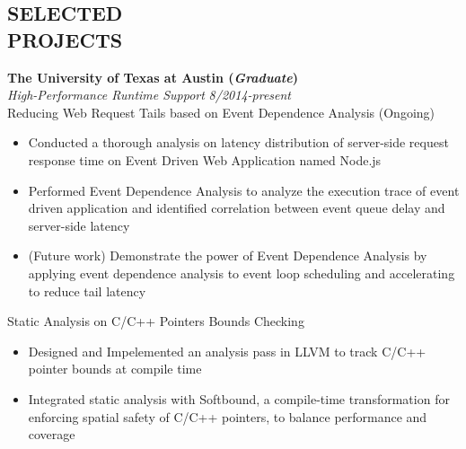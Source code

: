 \documentclass[margin, 9pt]{res} %
\begin{document}
\begin{resume}

\section{SELECTED\\ PROJECTS}

{\large\textbf{The University of Texas at Austin (\textit{Graduate})}}\\

\vspace*{-7pt}
{\large\textit{High-Performance Runtime Support}} \hfill\textit{8/2014-present}\\

\vspace*{-7pt}
Reducing Web Request Tails based on Event Dependence Analysis \hfill(Ongoing)\\
\vspace*{-10pt}
\begin{itemize}[leftmargin=*] \itemsep -3pt
\vspace*{-5pt}
	\item Conducted a thorough analysis on latency distribution of server-side request response time on Event Driven Web Application named Node.js
	\item Performed Event Dependence Analysis to analyze the execution trace of event driven application and identified correlation between event queue delay and server-side latency 
	\item (Future work) Demonstrate the power of Event Dependence Analysis by applying event dependence analysis to event loop scheduling and accelerating to reduce tail latency
\end{itemize}

\medskip
Static Analysis on C/C++ Pointers Bounds Checking\\
\vspace*{-10pt}
\begin{itemize}[leftmargin=*] \itemsep -3pt
\vspace*{-5pt}
	\item Designed and Impelemented an analysis pass in LLVM to track C/C++ pointer bounds at compile time
	\item Integrated static analysis with Softbound, a compile-time transformation for enforcing spatial safety of C/C++ pointers, to balance performance and coverage
\end{itemize}


\end{resume}
\end{document}
